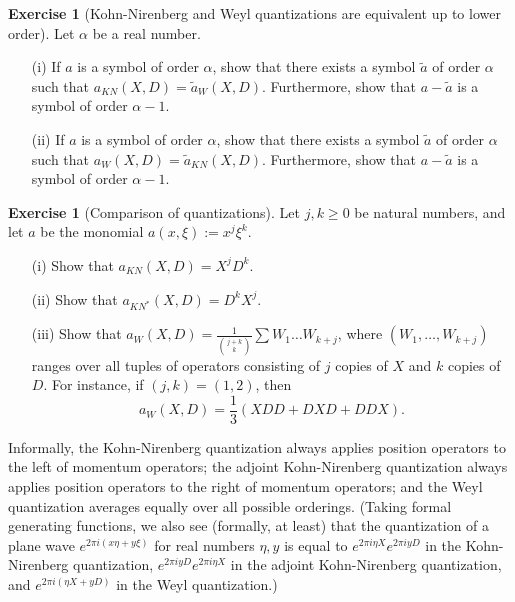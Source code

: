 \documentclass[11pt]{article}
\theoremstyle{definition}
\newtheorem{exercise}[theorem]{Exercise}
\begin{document}
\begin{exercise}[Kohn-Nirenberg and Weyl quantizations are equivalent up to lower order]
 \label{knw} Let \({\alpha}\) be a real number. 
\begin{itemize}

\item[(i)] If \({a}\) is a symbol of order \({\alpha}\), show that there exists a symbol \({\tilde a}\) of order \({\alpha}\) such that \({a_{KN}(X,D) = \tilde a_W(X,D)}\). Furthermore, show that \({a-\tilde a}\) is a symbol of order \({\alpha-1}\). 
\item[(ii)] If \({a}\) is a symbol of order \({\alpha}\), show that there exists a symbol \({\tilde a}\) of order \({\alpha}\) such that \({a_{W}(X,D) = \tilde a_{KN}(X,D)}\). Furthermore, show that \({a-\tilde a}\) is a symbol of order \({\alpha-1}\).


\end{itemize}

\end{exercise}
\begin{exercise}[Comparison of quantizations]
  Let \({j,k \geq 0}\) be natural numbers, and let \({a}\) be the monomial \({a(x,\xi) := x^j \xi^k}\). 
\begin{itemize}

\item[(i)] Show that \({a_{KN}(X,D) = X^j D^k}\). 
\item[(ii)] Show that \({a_{KN^*}(X,D) = D^k X^j}\). 
\item[(iii)] Show that \({a_W(X,D) = \frac{1}{\binom{j+k}{k}} \sum W_1 \dots W_{k+j}}\), where \({(W_1,\dots,W_{k+j})}\) ranges over all tuples of operators consisting of \({j}\) copies of \({X}\) and \({k}\) copies of \({D}\). For instance, if \({(j,k)=(1,2)}\), then
\[\displaystyle  a_W(X,D) = \frac{1}{3} (XDD + DXD + DDX).\]


\end{itemize}
 Informally, the Kohn-Nirenberg quantization always applies position operators to the left of momentum operators; the adjoint Kohn-Nirenberg quantization always applies position operators to the right of momentum operators; and the Weyl quantization averages equally over all possible orderings. (Taking formal generating functions, we also see (formally, at least) that the quantization of a plane wave \({e^{2\pi i (x \eta + y \xi)}}\) for real numbers \({\eta,y}\) is equal to \({e^{2\pi i \eta X} e^{2\pi i y D}}\) in the Kohn-Nirenberg quantization, \({e^{2\pi i yD} e^{2\pi i \eta X}}\) in the adjoint Kohn-Nirenberg quantization, and \({e^{2\pi i(\eta X + yD)}}\) in the Weyl quantization.) 
\end{exercise}
\end{document}
